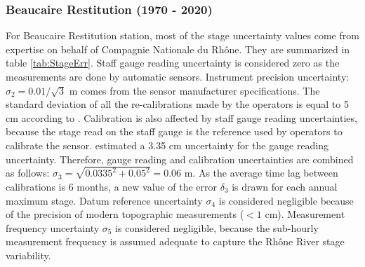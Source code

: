 \documentclass[11pt]{article}
\begin{document}
    \subsubsection{Beaucaire Restitution (1970 - 2020)}
    
    For Beaucaire Restitution station, most of the stage uncertainty values come from \citet{cetiat_conference_2005} expertise on behalf of Compagnie Nationale du Rhône. They are summarized in table \ref{tab:StageErr}. Staff gauge reading uncertainty is considered zero as the measurements are done by automatic sensors. Instrument precision uncertainty: $\sigma_2 = 0.01/\sqrt{3}$ m comes from the sensor manufacturer specifications. The standard deviation of all the re-calibrations made by the operators is equal to 5 cm according to \citet{cetiat_conference_2005}. Calibration is also affected by staff gauge reading uncertainties, because the stage read on the staff gauge is the reference used by operators to calibrate the sensor. \citet{cetiat_conference_2005} estimated a 3.35 cm uncertainty for the gauge reading uncertainty. Therefore, gauge reading and calibration uncertainties are combined as follows: $\sigma_3 = \sqrt{0.0335^2 + 0.05^2} = 0.06$ m. As the average time lag between calibrations is 6 months, a new value of the error $\delta_3$ is drawn for each annual maximum stage. Datum reference uncertainty $\sigma_4$ is considered negligible because of the precision of modern topographic measurements ($<1$ cm). Measurement frequency uncertainty $\sigma_5$ is considered negligible, because the sub-hourly measurement frequency is assumed adequate to capture the Rhône River stage variability. 
        
\end{document}
